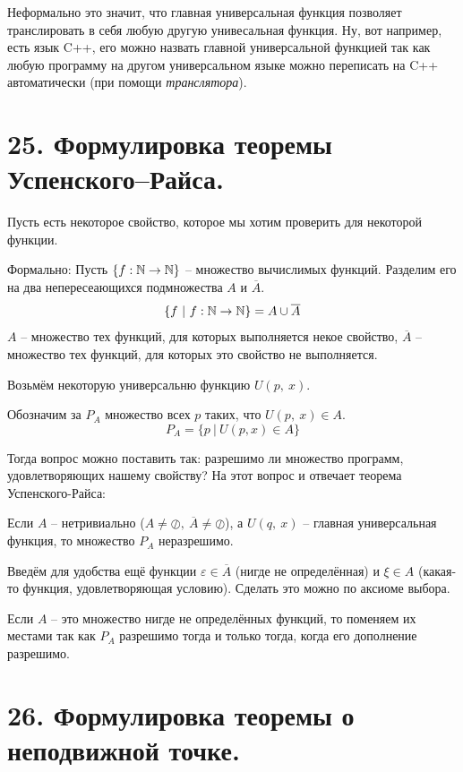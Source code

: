 
Неформально это значит, что главная универсальная функция позволяет транслировать
в себя любую другую унивесальная функция. Ну, вот например, есть язык C++, его можно
назвать главной универсальной функцией так как любую программу на другом универсальном
языке можно переписать на C++ автоматически (при помощи \emph{транслятора}).

\section*{25. Формулировка теоремы Успенского–Райса.}

Пусть есть некоторое свойство, которое мы хотим проверить
для некоторой функции. 

Формально:
Пусть $\{f:\mathbb{N}\to\mathbb{N}\}$ -- множество вычислимых функций. 
Разделим его на два непересеающихся подмножества $A$ и $\overline{A}$.
\[
\{f\ |\ f:\mathbb{N}\to\mathbb{N}\} = A \cup \overline{A}
\]
$A$ -- множество тех функций, для которых выполняется некое свойство,
$\overline{A}$ -- множество тех функций, для которых это свойство не выполняется.

Возьмём некоторую универсальню функцию $U(p,\ x)$.

Обозначим за $P_A$ множество всех $p$ таких, что $U(p,\ x) \in A$.
\[
P_A = \{p\ |\ U(p, x) \in A\}
\]

Тогда вопрос можно поставить так: разрешимо ли множество
программ, удовлетворяющих нашему свойству? На этот вопрос и отвечает теорема
Успенского-Райса:
\begin{usp-rais}
	Если $A$ -- нетривиально ($A \neq \oslash,\ \overline{A} \neq \oslash$), а $U(q,\ x)$ -- главная универсальная функция, то множество $P_A$ неразрешимо.
\end{usp-rais}
Введём для удобства ещё функции $\varepsilon \in \overline{A}$ (нигде не 
определённая) и $\xi \in A$ (какая-то функция, удовлетворяющая условию).
Сделать это можно по аксиоме выбора.

Если $A$ -- это множество нигде не определённых функций, то поменяем их
местами так как $P_A$ разрешимо тогда и только тогда, когда его
дополнение разрешимо.

\section*{26. Формулировка теоремы о неподвижной точке.}

